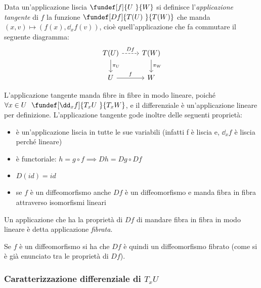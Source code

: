
\begin{defn}
Data un'applicazione liscia $\fundef[f]{U~}{W}$ si definisce l'\emph{applicazione tangente} di $f$ la funzione $\fundef[Df]{T(U)~}{T(W)}$ che manda $(x,v) \mapsto (f(x), \dd_xf(v))$, cioè quell'applicazione che fa commutare il seguente diagramma:
\begin{equation*}
\begin{tikzcd}
	T(U) \arrow[r, dashrightarrow, "Df"] \arrow[d, "\pi _U"]
		& T(W) \arrow[d, "\pi _W"] \\
	U \arrow[r, "f"]
		& W
\end{tikzcd}
\end{equation*}
\end{defn}

\begin{oss}
L'applicazione tangente manda fibre in fibre in modo lineare, poiché $\forall x\in U~~ \fundef[\dd_xf]{T_x U~}{T_x W}$, e il differenziale è un'applicazione lineare per definizione.
L'applicazione tangente gode inoltre delle seguenti proprietà:
\begin{itemize}
\item è un'applicazione liscia in tutte le sue variabili (infatti f è liscia e, $\dd_xf$ è liscia perché lineare)
\item è functoriale: $h = g\circ f \implies Dh = Dg\circ Df$
\item $D(id) = id$
\item se $f$ è un diffeomorfismo anche $Df$ è un diffeomorfismo e manda fibra in fibra attraverso isomorfismi lineari
\end{itemize}
\end{oss}

\begin{defn}
Un applicazione che ha la proprietà di $Df$ di mandare fibra in fibra in modo lineare è detta applicazione \emph{fibrata}.
\end{defn}

Se $f$ è un diffeomorfismo si ha che $Df$ è quindi un diffeomorfismo fibrato (come si è già enunciato tra le proprietà di $Df$).

\subsubsection{Caratterizzazione differenziale di $T_x U$} %

